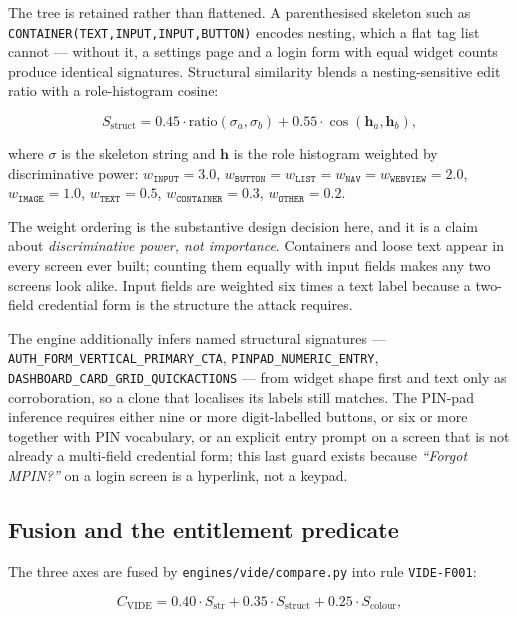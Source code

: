 \documentclass{article}
\begin{document}
The tree is retained rather than flattened. A parenthesised skeleton such as
\texttt{CONTAINER(TEXT,INPUT,INPUT,BUTTON)} encodes nesting, which a flat tag
list cannot --- without it, a settings page and a login form with equal widget
counts produce identical signatures. Structural similarity blends a
nesting-sensitive edit ratio with a role-histogram cosine:

\begin{equation}
S_{\mathrm{struct}} = 0.45 \cdot \mathrm{ratio}\!\left(\sigma_a, \sigma_b\right)
 + 0.55 \cdot \cos\!\left(\mathbf{h}_a, \mathbf{h}_b\right),
\label{eq:tree}
\end{equation}

where $\sigma$ is the skeleton string and $\mathbf{h}$ is the role histogram
weighted by discriminative power: $w_{\texttt{INPUT}} = 3.0$,
$w_{\texttt{BUTTON}} = w_{\texttt{LIST}} = w_{\texttt{NAV}} =
w_{\texttt{WEBVIEW}} = 2.0$, $w_{\texttt{IMAGE}} = 1.0$,
$w_{\texttt{TEXT}} = 0.5$, $w_{\texttt{CONTAINER}} = 0.3$,
$w_{\texttt{OTHER}} = 0.2$.

The weight ordering is the substantive design decision here, and it is a claim
about \emph{discriminative power, not importance}. Containers and loose text
appear in every screen ever built; counting them equally with input fields makes
any two screens look alike. Input fields are weighted six times a text label
because a two-field credential form is the structure the attack requires.

The engine additionally infers named structural signatures ---
\texttt{AUTH\_FORM\_VERTICAL\_PRIMARY\_CTA}, \texttt{PINPAD\_NUMERIC\_ENTRY},
\texttt{DASHBOARD\_CARD\_GRID\_QUICKACTIONS} --- from widget shape first and
text only as corroboration, so a clone that localises its labels still matches.
The PIN-pad inference requires either nine or more digit-labelled buttons, or
six or more together with PIN vocabulary, or an explicit entry prompt on a
screen that is not already a multi-field credential form; this last guard exists
because \emph{``Forgot MPIN?''} on a login screen is a hyperlink, not a keypad.

\subsection{Fusion and the entitlement predicate}
\label{ssec:vide-fusion}

The three axes are fused by \texttt{engines/vide/compare.py} into rule
\texttt{VIDE-F001}:

\begin{equation}
C_{\mathrm{VIDE}} = 0.40 \cdot S_{\mathrm{str}}
 + 0.35 \cdot S_{\mathrm{struct}}
 + 0.25 \cdot S_{\mathrm{colour}},
\label{eq:vide}
\end{equation}
\end{document}
